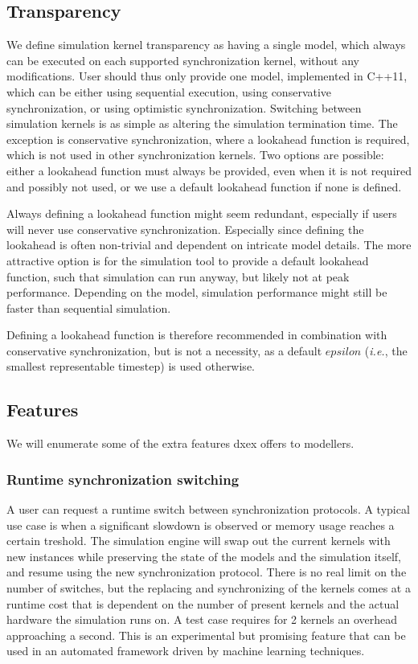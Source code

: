 \subsection{Transparency}
We define simulation kernel transparency as having a single model, which always can be executed on each supported synchronization kernel, without any modifications.
User should thus only provide one model, implemented in C++11, which can be either using sequential execution, using conservative synchronization, or using optimistic synchronization.
Switching between simulation kernels is as simple as altering the simulation termination time.
The exception is conservative synchronization, where a lookahead function is required, which is not used in other synchronization kernels.
Two options are possible: either a lookahead function must always be provided, even when it is not required and possibly not used, or we use a default lookahead function if none is defined.

Always defining a lookahead function might seem redundant, especially if users will never use conservative synchronization.
Especially since defining the lookahead is often non-trivial and dependent on intricate model details.
The more attractive option is for the simulation tool to provide a default lookahead function, such that simulation can run anyway, but likely not at peak performance.
Depending on the model, simulation performance might still be faster than sequential simulation. 

Defining a lookahead function is therefore recommended in combination with conservative synchronization, but is not a necessity, as a default $epsilon$ (\textit{i.e.}, the smallest representable timestep) is used otherwise.

\subsection{Features}
We will enumerate some of the extra features dxex offers to modellers.
\subsubsection{Runtime synchronization switching}
A user can request a runtime switch between synchronization protocols. A typical use case is when a significant slowdown is observed or memory usage reaches a certain treshold. The simulation engine will swap out the current kernels with new instances while preserving the state of the models and the simulation itself, and resume using the new synchronization protocol. There is no real limit on the number of switches, but the replacing and synchronizing of the kernels comes at a runtime cost that is dependent on the number of present kernels and the actual hardware the simulation runs on. A test case requires for 2 kernels an overhead approaching a second. This is an experimental but promising feature that can be used in an automated framework driven by machine learning techniques.
